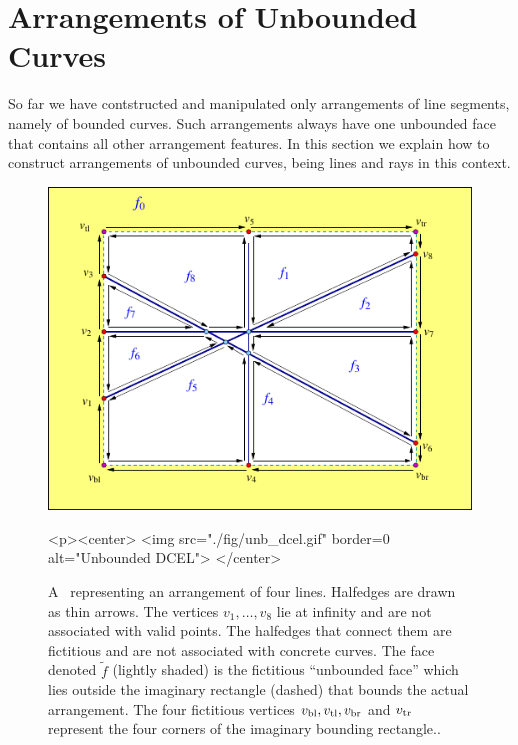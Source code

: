 \section{Arrangements of Unbounded Curves\label{arr_sec:unbounded}}

So far we have contstructed and manipulated only arrangements of
line segments, namely of bounded curves. Such arrangements always
have one unbounded face that contains all other arrangement features.
In this section we explain how to construct arrangements of unbounded
curves, being lines and rays in this context.

\begin{figure}[t]
\begin{ccTexOnly}
  \begin{center}
  \includegraphics{Arrangement_2/fig/unb_dcel}
  \end{center}
\end{ccTexOnly}
\begin{ccHtmlOnly}
  <p><center>
  <img src="./fig/unb_dcel.gif" border=0 alt="Unbounded DCEL">
  </center>
\end{ccHtmlOnly}
\caption{A \dcel\ representing an arrangement of four lines.
Halfedges are drawn as thin arrows. The vertices $v_1, \ldots, v_8$
lie at infinity and are not associated with valid points. The
halfedges that connect them are fictitious and are not associated
with concrete curves. The face denoted $\tilde{f}$ (lightly shaded)
is the fictitious ``unbounded face'' which lies outside the imaginary
rectangle (dashed) that bounds the actual arrangement. The four
fictitious vertices $v_{\rm bl}, v_{\rm tl}, v_{\rm br}$ and
$v_{\rm tr}$ represent the four corners of the imaginary bounding
rectangle..\label{arr_fig:unb_dcel}}
\end{figure}

